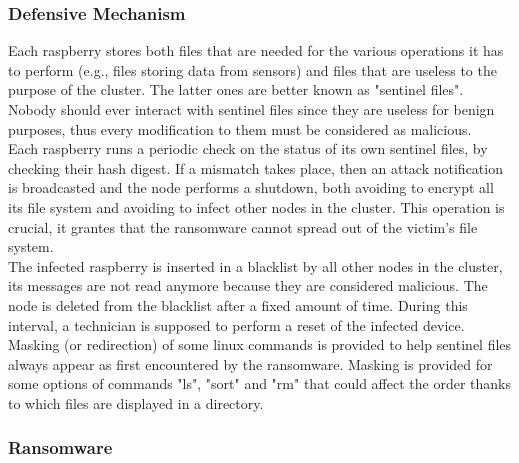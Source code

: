 
\subsubsection{Defensive Mechanism}

\noindent Each raspberry stores both files that are needed for the various operations it has to perform (e.g., files storing data from sensors) and files that are useless to the purpose of the cluster. The latter ones are better known as "sentinel files". Nobody should ever interact with sentinel files since they are useless for benign purposes, thus every modification to them must be considered as malicious.\\
Each raspberry runs a periodic check on the status of its own sentinel files, by checking their hash digest. If a mismatch takes place, then an attack notification is broadcasted and the node performs a shutdown, both avoiding to encrypt all its file system and avoiding to infect other nodes in the cluster. This operation is crucial, it grantes that the ransomware cannot spread out of the victim's file system. \\
The infected raspberry is inserted in a blacklist by all other nodes in the cluster, its messages are not read anymore because they are considered malicious. The node is deleted from the blacklist after a fixed amount of time. During this interval, a technician is supposed to perform a reset of the infected device.\\
Masking (or redirection) of some linux commands is provided to help sentinel files always appear as first encountered by the ransomware. Masking is provided for some options of commands "ls", "sort" and "rm" that could affect the order thanks to which files are displayed in a directory.

\subsubsection{Ransomware}

